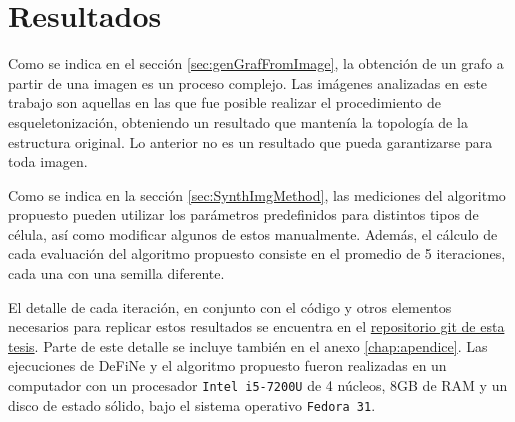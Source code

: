 \chapter{Resultados}
\label{chap:res}

Como se indica en el secci\'on \ref{sec:genGrafFromImage}, la obtenci\'on de un grafo a partir de una imagen es un proceso complejo. Las im\'agenes analizadas en este trabajo son aquellas en las que fue posible realizar el procedimiento de esqueletonizaci\'on, obteniendo un resultado que manten\'ia la topolog\'ia de la estructura original. Lo anterior no es un resultado que pueda garantizarse para toda imagen. 





Como se indica en la secci\'on \ref{sec:SynthImgMethod}, las mediciones del algoritmo propuesto pueden utilizar los par\'ametros predefinidos para distintos tipos de c\'elula, as\'i como modificar algunos de estos manualmente. Adem\'as, el c\'alculo de cada evaluaci\'on del algoritmo propuesto consiste en el promedio de 5 iteraciones, cada una con una semilla diferente.

El detalle de cada iteraci\'on, en conjunto con el c\'odigo y otros elementos necesarios para replicar estos resultados se encuentra en el \href{https://gitlab.com/LeoXDXp/graph-crawler}{repositorio git de esta tesis}. Parte de este detalle se incluye tambi\'en en el anexo \ref{chap:apendice}.
Las ejecuciones de DeFiNe y el algoritmo propuesto fueron realizadas en un computador con un procesador {\tt Intel i5-7200U} de 4 n\'ucleos, 8GB de RAM y un disco de estado s\'olido, bajo el sistema operativo {\tt Fedora 31}.

